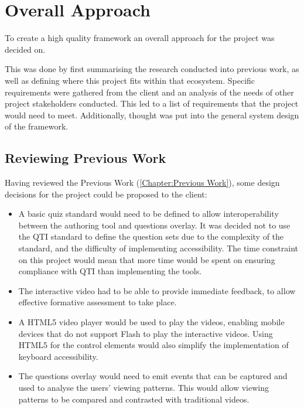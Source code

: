 \chapter{Overall Approach}
\label{Chapter:Overall Approach}

\begin{preamble}
	To create a high quality framework an overall approach for the project was decided on.

	This was done by first summarising the research conducted into previous work, as well as defining where this project fits within that ecosystem. Specific requirements were gathered from the client and an analysis of the needs of other project stakeholders conducted. This led to a list of requirements that the project would need to meet. Additionally, thought was put into the general system design of the framework.
\end{preamble}

\section{Reviewing Previous Work}
\label{Section:Reviewing Previous Work}
Having reviewed the Previous Work (\autoref{Chapter:Previous Work}), some design decisions for the project could be proposed to the client:
\begin{itemize}
	\item A basic quiz standard would need to be defined to allow interoperability between the authoring tool and questions overlay. It was decided not to use the \gls{QTI} standard to define the question sets due to the complexity of the standard, and the difficulty of implementing accessibility. The time constraint on this project would mean that more time would be spent on ensuring compliance with \gls{QTI} than implementing the tools.

	\item The interactive video had to be able to provide immediate feedback, to allow effective formative assessment to take place.

	\item A \gls{HTML5} video player would be used to play the videos, enabling mobile devices that do not support Flash to play the interactive videos. Using \gls{HTML5} for the control elements would also simplify the implementation of keyboard accessibility.

	\item The questions overlay would need to emit events that can be captured and used to analyse the users' viewing patterns. This would allow viewing patterns to be compared and contrasted with traditional videos.
\end{itemize}

